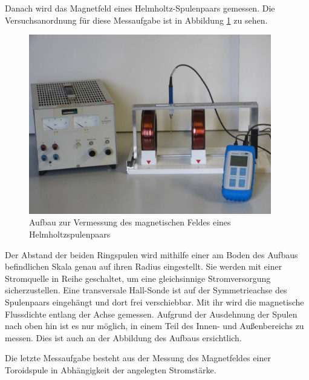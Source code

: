 Danach wird das Magnetfeld eines Helmholtz-Spulenpaars gemessen. Die Versuchsanordnung
für diese Messaufgabe ist in Abbildung \ref{fig:Aufbau_helmholtz} zu sehen.
\begin{figure}
  \centering
  \includegraphics[width=300pt]{data/aufbau2.png}
  \caption{Aufbau zur Vermessung des magnetischen Feldes eines
  Helmholtzspulenpaars \cite{Versuchsanleitung}}
  \label{fig:Aufbau_helmholtz}
\end{figure}
Der Abstand der beiden Ringspulen wird mithilfe einer am Boden des Aufbaus
befindlichen Skala genau auf ihren Radius eingestellt. Sie werden mit einer Stromquelle
in Reihe geschaltet, um eine gleichsinnige Stromversorgung sicherzustellen.
Eine transversale Hall-Sonde ist auf der Symmetrieachse des Spulenpaars eingehängt und
dort frei verschiebbar. Mit ihr wird die magnetische Flussdichte entlang der Achse
gemessen. Aufgrund der Ausdehnung der Spulen nach oben hin ist es nur möglich,
in einem Teil des Innen- und Außenbereichs zu messen. Dies ist auch an der Abbildung
des Aufbaus ersichtlich.

Die letzte Messaufgabe besteht aus der Messung des Magnetfeldes einer Toroidspule
in Abhängigkeit der angelegten Stromstärke.
